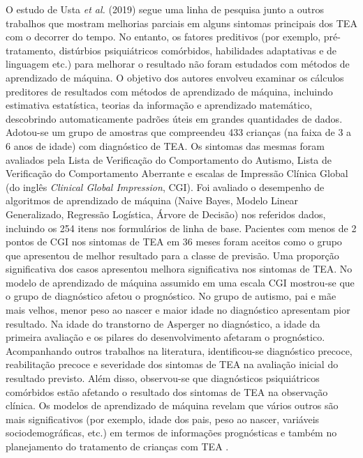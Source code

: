 \documentclass{template/sig-alternate-05-2015}
\begin{document}
O estudo de Usta \textit{et al.} (2019) segue uma linha de pesquisa
junto a outros trabalhos que mostram melhorias parciais em alguns
sintomas principais dos TEA com o decorrer do tempo. No entanto, os
fatores preditivos (por exemplo, pré-tratamento, distúrbios
psiquiátricos comórbidos, habilidades adaptativas e de linguagem etc.)
para melhorar o resultado não foram estudados com métodos de
aprendizado de máquina. O objetivo dos autores envolveu examinar os
cálculos preditores de resultados com métodos de aprendizado de
máquina, incluindo estimativa estatística, teorias da informação e
aprendizado matemático, descobrindo automaticamente padrões úteis em
grandes quantidades de dados. Adotou-se um grupo de amostras que
compreendeu 433 crianças (na faixa de 3 a 6 anos de idade) com
diagnóstico de TEA. Os sintomas das mesmas foram avaliados pela Lista
de Verificação do Comportamento do Autismo, Lista de Verificação do
Comportamento Aberrante e escalas de Impressão Clínica Global (do
inglês \textit{Clinical Global Impression}, CGI)\cite{Usta:2019}. Foi
avaliado o desempenho de algoritmos de aprendizado de máquina (Naive
Bayes, Modelo Linear Generalizado, Regressão Logística, Árvore de
Decisão) nos referidos dados, incluindo os 254 itens nos formulários
de linha de base. Pacientes com menos de 2 pontos de CGI nos sintomas
de TEA em 36 meses foram aceitos como o grupo que apresentou de melhor
resultado para a classe de previsão. Uma proporção significativa dos
casos apresentou melhora significativa nos sintomas de TEA. No modelo
de aprendizado de máquina assumido em uma escala CGI mostrou-se que o
grupo de diagnóstico afetou o prognóstico. No grupo de autismo, pai e
mãe mais velhos, menor peso ao nascer e maior idade no diagnóstico
apresentam pior resultado. Na idade do transtorno de Asperger no
diagnóstico, a idade da primeira avaliação e os pilares do
desenvolvimento afetaram o prognóstico. Acompanhando outros trabalhos
na literatura, identificou-se diagnóstico precoce, reabilitação
precoce e severidade dos sintomas de TEA na avaliação inicial do
resultado previsto. Além disso, observou-se que diagnósticos
psiquiátricos comórbidos estão afetando o resultado dos sintomas de
TEA na observação clínica. Os modelos de aprendizado de máquina
revelam que vários outros são mais significativos (por exemplo, idade
dos pais, peso ao nascer, variáveis sociodemográficas, etc.) em termos
de informações prognósticas e também no planejamento do tratamento de
crianças com TEA \cite{Usta:2019}.
\end{document}
